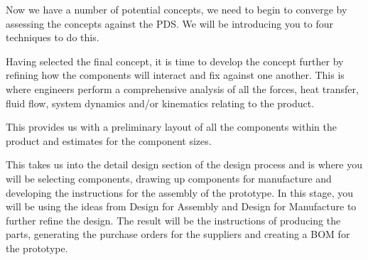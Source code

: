 Now we have a number of potential concepts, we need to begin to converge by assessing the concepts against the \ac{PDS}. We will be introducing you to four techniques to do this.

 Having selected the final concept, it is time to develop the concept further by refining how the components will interact and fix against one another. This is where engineers perform a comprehensive analysis of all the forces, heat transfer, fluid flow, system dynamics and/or kinematics relating to the product.

This provides us with a preliminary layout of all the components within the product and estimates for the component sizes.

This takes us into the detail design section of the design process and is where you will be selecting components, drawing up components for manufacture and developing the instructions for the assembly of the prototype. In this stage, you will be using the ideas from Design for Assembly and Design for Manufacture to further refine the design. The result will be the instructions of producing the parts, generating the purchase orders for the suppliers and creating a \acf{BOM} for the prototype.

